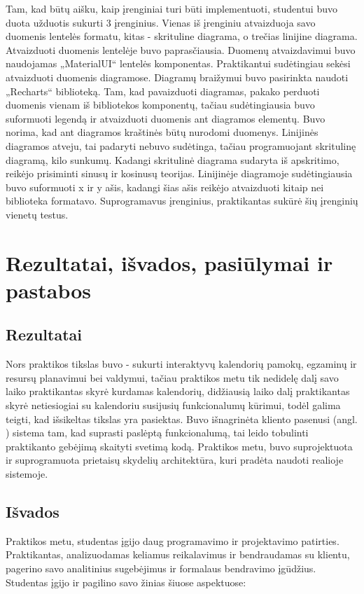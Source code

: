 \documentclass{VUMIFPSbakalaurinis}
\begin{document}
Tam, kad būtų aišku, kaip įrenginiai turi būti implementuoti, studentui buvo duota užduotis sukurti 3 įrenginius. Vienas iš įrenginiu atvaizduoja savo duomenis lentelės formatu, kitas - skrituline diagrama, o trečias linijine diagrama. Atvaizduoti duomenis lentelėje buvo paprasčiausia. Duomenų atvaizdavimui buvo naudojamas „MaterialUI“ lentelės komponentas. Praktikantui sudėtingiau sekėsi atvaizduoti duomenis diagramose. Diagramų braižymui buvo pasirinkta naudoti „Recharts“ biblioteką. Tam, kad pavaizduoti diagramas, pakako perduoti duomenis vienam iš bibliotekos komponentų, tačiau sudėtingiausia buvo suformuoti legendą ir atvaizduoti duomenis ant diagramos elementų. Buvo norima, kad ant diagramos kraštinės būtų nurodomi duomenys. Linijinės diagramos atveju, tai padaryti nebuvo sudėtinga, tačiau programuojant skritulinę diagramą, kilo sunkumų. Kadangi skritulinė diagrama sudaryta iš apskritimo, reikėjo prisiminti sinusų ir kosinusų teorijas. Linijinėje diagramoje sudėtingiausia buvo suformuoti x ir y ašis, kadangi šias ašis reikėjo atvaizduoti kitaip nei biblioteka formatavo. Suprogramavus įrenginius, praktikantas sukūrė šių įrenginių vienetų testus.

\section{Rezultatai, išvados, pasiūlymai ir pastabos}

\subsection{Rezultatai}
Nors praktikos tikslas buvo - sukurti interaktyvų kalendorių pamokų, egzaminų ir resursų planavimui bei valdymui, tačiau praktikos metu tik nedidelę dalį savo laiko praktikantas skyrė kurdamas kalendorių, didžiausią laiko dalį praktikantas skyrė netiesiogiai su kalendoriu susijusių funkcionalumų kūrimui, todėl galima teigti, kad išsikeltas tikslas yra pasiektas. Buvo išnagrinėta kliento pasenusi (angl. ) sistema tam, kad suprasti paslėptą funkcionalumą, tai leido tobulinti praktikanto gebėjimą skaityti svetimą kodą. Praktikos metu, buvo suprojektuota ir suprogramuota prietaisų skydelių architektūra, kuri pradėta naudoti realioje sistemoje.

\subsection{Išvados}
Praktikos metu, studentas įgijo daug programavimo ir projektavimo patirties. Praktikantas, analizuodamas keliamus reikalavimus ir bendraudamas su klientu, pagerino savo analitinius sugebėjimus ir formalaus bendravimo įgūdžius. Studentas įgijo ir pagilino savo žinias šiuose aspektuose:
\end{document}
